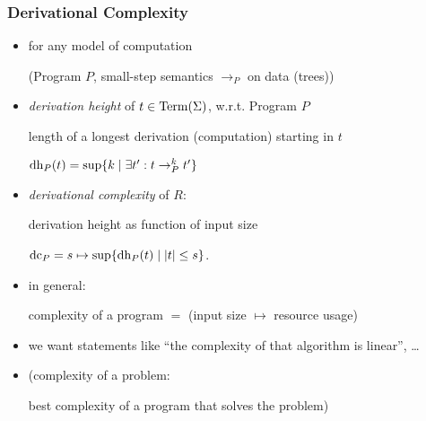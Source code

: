 \begin{frame}[fragile]
\frametitle{Derivational Complexity}

  \begin{itemize}[<+->]
  \item 
    for any model of computation 

    (Program $P$, small-step semantics $\to_P$ on data (trees))
  \item
    \emph{derivation height} of $t\in \operatorname{Term}(\Sigma)$, 
w.r.t. Program $P$

    length of a longest derivation (computation) starting in $t$

    $\operatorname{dh}_P(t)=\sup\{ k\mid \exists t': t\to_P^k t' \}$
  \item 
    \emph{derivational complexity} of $R$:

    derivation height as function of input size

    $\operatorname{dc}_P= s \mapsto \sup \{\operatorname{dh}_P(t) \mid |t|\le s \}$.
  \item in general:
    
    complexity of a program $=$ (input size $\mapsto$ resource usage)

  \item we want statements like ``the complexity of that algorithm
    is linear'', \dots

  \item     (complexity of a problem:  

    best complexity of a program that solves the problem)

  \end{itemize}

\end{frame}
